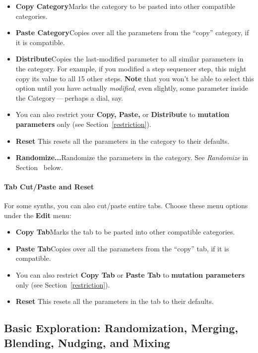 \documentclass{article}
\begin{document}
\begin{itemize}
\item {\bf Copy Category}\quad Marks the category to be pasted into other compatible categories.
\item {\bf Paste Category}\quad   Copies over all the parameters from the ``copy'' category, if it is compatible.
\item {\bf Distribute}\quad  Copies the last-modified parameter to all similar parameters in the category.  For example, if you modified a step sequencer step, this might copy its value to all 15 other steps.  {\bf Note} that you won't be able to select this option until you have actually {\it modified}, even slightly, some parameter inside the Category\,---\,perhaps a dial, say.
\item You can also restrict your {\bf Copy, Paste,} or {\bf Distribute} to {\bf mutation parameters} only (see Section~\ref{restriction}).
\item {\bf Reset} \quad  This resets all the parameters in the category to their defaults.
\item {\bf Randomize...}\quad Randomize the parameters in the category.  See {\it Randomize} in Section~\label{explorationtools} below.
\end{itemize}

\paragraph{Tab Cut/Paste and Reset}  For some synths, you can also cut/paste entire tabs.  Choose these menu options under the {\bf Edit} menu:

\begin{itemize}
\item {\bf Copy Tab}\quad Marks the tab to be pasted into other compatible categories.
\item {\bf Paste Tab}\quad   Copies over all the parameters from the ``copy'' tab, if it is compatible.
\item You can also restrict {\bf Copy Tab} or {\bf Paste Tab} to {\bf mutation parameters} only (see Section~\ref{restriction}).
\item {\bf Reset} \quad  This resets all the parameters in the tab to their defaults.
\end{itemize}

\subsection{Basic Exploration: Randomization, Merging, Blending, Nudging, and Mixing} 
\label{explorationtools} 
\end{document}
